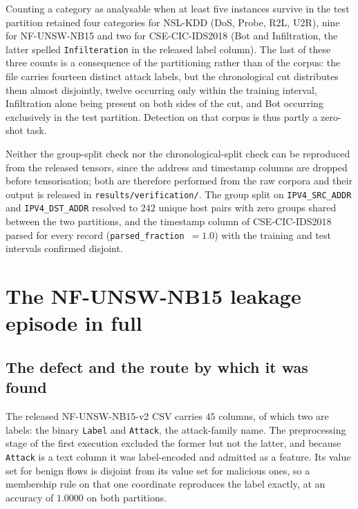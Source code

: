 \documentclass[11pt,a4paper]{article}
\begin{document}
Counting a category as analysable when at least five instances survive
in the test partition retained four categories for NSL-KDD (DoS, Probe,
R2L, U2R), nine for NF-UNSW-NB15 and two for CSE-CIC-IDS2018 (Bot and
Infiltration, the latter spelled \texttt{Infilteration} in the released
label column). The last of these three counts is a consequence of the
partitioning rather than of the corpus: the file carries fourteen
distinct attack labels, but the chronological cut distributes them
almost disjointly, twelve occurring only within the training interval,
Infiltration alone being present on both sides of the cut, and Bot
occurring exclusively in the test partition. Detection on that corpus
is thus partly a zero-shot task.

Neither the group-split check nor the chronological-split check can be
reproduced from the released tensors, since the address and timestamp
columns are dropped before tensorisation; both are therefore performed
from the raw corpora and their output is released in
\texttt{results/verification/}. The group split on
\texttt{IPV4\_SRC\_ADDR} and \texttt{IPV4\_DST\_ADDR} resolved to $242$
unique host pairs with zero groups shared between the two partitions,
and the timestamp column of CSE-CIC-IDS2018 parsed for every record
(\texttt{parsed\_fraction}~$=1.0$) with the training and test intervals
confirmed disjoint.

\section{The NF-UNSW-NB15 leakage episode in full}
\label{sup:leak}

\subsection{The defect and the route by which it was found}

The released NF-UNSW-NB15-v2 CSV carries $45$ columns, of which two are
labels: the binary \texttt{Label} and \texttt{Attack}, the attack-family
name. The preprocessing stage of the first execution excluded the
former but not the latter, and because \texttt{Attack} is a text column
it was label-encoded and admitted as a feature. Its value set for benign
flows is disjoint from its value set for malicious ones, so a
membership rule on that one coordinate reproduces the label exactly, at
an accuracy of $1.0000$ on both partitions.
\end{document}
